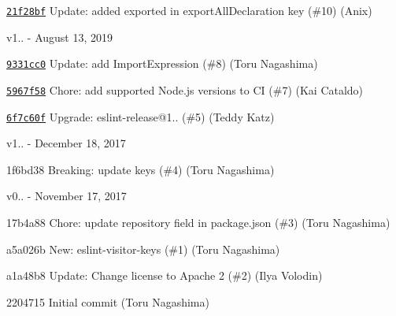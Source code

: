 \begin{DoxyItemize}
\item \href{https://github.com/eslint/eslint-visitor-keys/commit/21f28bf11be5329d740a8bf6bdbcd0ef13bbf1a2}{\texttt{ {\ttfamily 21f28bf}}} Update\+: added exported in export\+All\+Declaration key (\#10) (Anix)
\end{DoxyItemize}

v1.. -\/ August 13, 2019


\begin{DoxyItemize}
\item \href{https://github.com/eslint/eslint-visitor-keys/commit/9331cc09e756e65b9044c9186445a474b037fac6}{\texttt{ {\ttfamily 9331cc0}}} Update\+: add Import\+Expression (\#8) (Toru Nagashima)
\item \href{https://github.com/eslint/eslint-visitor-keys/commit/5967f583b04f17fba9226aaa394e45d476d2b8af}{\texttt{ {\ttfamily 5967f58}}} Chore\+: add supported Node.\+js versions to CI (\#7) (Kai Cataldo)
\item \href{https://github.com/eslint/eslint-visitor-keys/commit/6f7c60fef2ceec9f6323202df718321cec45cab0}{\texttt{ {\ttfamily 6f7c60f}}} Upgrade\+: eslint-\/release@1.. (\#5) (Teddy Katz)
\end{DoxyItemize}

v1.. -\/ December 18, 2017


\begin{DoxyItemize}
\item 1f6bd38 Breaking\+: update keys (\#4) (Toru Nagashima)
\end{DoxyItemize}

v0.. -\/ November 17, 2017


\begin{DoxyItemize}
\item 17b4a88 Chore\+: update {\ttfamily repository} field in package.\+json (\#3) (Toru Nagashima)
\item a5a026b New\+: eslint-\/visitor-\/keys (\#1) (Toru Nagashima)
\item a1a48b8 Update\+: Change license to Apache 2 (\#2) (Ilya Volodin)
\item 2204715 Initial commit (Toru Nagashima) 
\end{DoxyItemize}